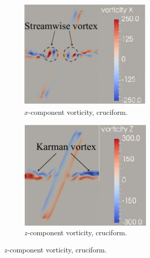 \documentclass[oneside]{utmthesis}
\begin{document}
\begin{figure}
  \centering
  \begin{subfigure}[h]{0.4\textwidth}
    \centering
    \includegraphics[width=0.7\textwidth]{figs/vorx675}
    \caption{$x$-component vorticity, \angfo{} cruciform.}
    \label{fig:vorx675}
  \end{subfigure}
  \begin{subfigure}[h]{0.4\textwidth}
    \centering
    \includegraphics[width=0.7\textwidth]{figs/vorz675}
    \caption{$z$-component vorticity, \angfo{} cruciform.}
    \label{fig:vorz675}
  \end{subfigure}


\end{figure}
\end{document}
